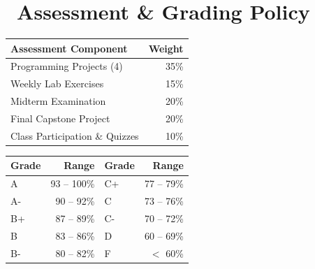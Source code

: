 \documentclass[11pt, a4paper]{article}
\begin{document}
\newpage

\section*{\faGraduationCap\ Assessment \& Grading Policy}

\noindent
\begin{minipage}[t]{0.48\textwidth}
  \begin{tcolorbox}[title={\sffamily\bfseries Grade Breakdown}, colback=white, colframe=NavyPrimary, coltitle=white, arc=3pt, boxrule=0.8pt]
    \small
    \begin{tabularx}{\textwidth}{X r}
      \textbf{Assessment Component} & \textbf{Weight} \\
      \midrule
      Programming Projects (4) & 35\% \\{}
      Weekly Lab Exercises & 15\% \\{}
      Midterm Examination & 20\% \\{}
      Final Capstone Project & 20\% \\{}
      Class Participation \& Quizzes & 10\% \\
      \bottomrule
    \end{tabularx}
  \end{tcolorbox}
\end{minipage}%
\hfill
\begin{minipage}[t]{0.48\textwidth}
  \begin{tcolorbox}[title={\sffamily\bfseries Letter Grade Scale}, colback=white, colframe=TealSecondary, coltitle=white, arc=3pt, boxrule=0.8pt]
    \small
    \begin{tabularx}{\textwidth}{X r | X r}
      \textbf{Grade} & \textbf{Range} & \textbf{Grade} & \textbf{Range} \\
      \midrule
      A  & 93 -- 100\% & C+ & 77 -- 79\% \\{}
      A- & 90 -- 92\%  & C  & 73 -- 76\% \\{}
      B+ & 87 -- 89\%  & C- & 70 -- 72\% \\{}
      B  & 83 -- 86\%  & D  & 60 -- 69\% \\{}
      B- & 80 -- 82\%  & F  & $<$ 60\% \\
      \bottomrule
    \end{tabularx}
  \end{tcolorbox}
\end{minipage}

\vspace{1em}
\end{document}
